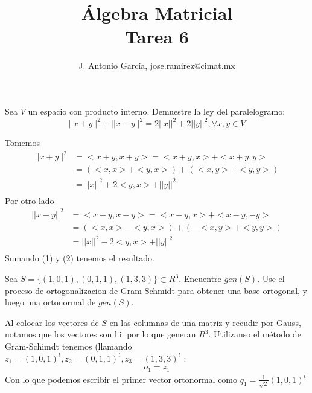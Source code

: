 \documentclass[letter]{memoir} %
\newenvironment{cframed}[1][blue]
  {\begin{tcolorbox}[colframe=#1,colback=white]}
  {\end{tcolorbox}}
\begin{document}
\title{Álgebra Matricial\\
\large{Tarea 6  }}
\author{ J. Antonio García, jose.ramirez@cimat.mx}

\maketitle
\begin{enumerate}
\begin{cframed}[violet]
\item Sea $V$ un espacio con producto interno. Demuestre la ley del paralelogramo:
\[
||x + y||^2 + ||x - y||^2 = 2||x||^2 + 2||y||^2, \forall x,y \in V
\]
\end{cframed}
Tomemos
\begin{equation}
\begin{split}
||x+y||^2 &= <x+y,x+y> = <x+y,x> +<x+y,y>  \\
		& = (<x,x> +<y,x>) + (<x,y> +<y,y>)  \\
        & = ||x||^2+2<y,x>+||y||^2 \\
\end{split}
\end{equation}
Por otro lado 
\begin{equation}
\begin{split}
||x-y||^2 &= <x-y,x-y> = <x-y,x> +<x-y,-y>  \\
		& = (<x,x> -<y,x>) + (-<x,y> +<y,y>)  \\
        & = ||x||^2-2<y,x>+||y||^2 \\
\end{split}
\end{equation}
Sumando (1) y (2)  tenemos el resultado.

\begin{cframed}[teal]
\item Sea $S = \{(1, 0, 1), (0, 1, 1), (1, 3, 3)\} \subset  R^3$. Encuentre $gen(S)$. Use el proceso
de ortogonalizacion de Gram-Schmidt para obtener una base ortogonal, y luego una ortonormal de $gen(S)$.
\end{cframed}
Al colocar los vectores de $S$ en las columnas de una matriz y recudir por Gauss, notamos que los vectores son l.i. por lo que generan $R^3$.
Utilizanso el método de Gram-Schimdt tenemos (llamando $z_1 = (1, 0, 1)^t, z_2 = (0, 1, 1)^t, z_3 = (1, 3, 3)^t$ :
\begin{equation*}
\begin{split}
o_1 = z_1
\end{split}
\end{equation*}
Con lo que podemos escribir el primer vector ortonormal como $q_1 = \frac{1}{\sqrt{2}}(1,0,1)^t$


\end{enumerate}
\end{document}
